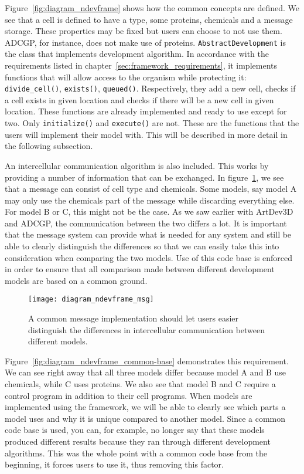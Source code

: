 Figure~\ref{fig:diagram_ndevframe} shows how the common concepts are defined. We see that a cell is defined to have a type, some proteins, chemicals and a message storage. These properties may be fixed but users can choose to not use them. ADCGP, for instance, does not make use of proteins. \texttt{AbstractDevelopment} is the class that implements development algorithm. In accordance with the requirements listed in chapter~\ref{sec:framework_requirements}, it implements functions that will allow access to the organism while protecting it: \texttt{divide\_cell()}, \texttt{exists()}, \texttt{queued()}. Respectively, they add a new cell, checks if a cell exists in given location and checks if there will be a new cell in given location. These functions are already implemented and ready to use except for two. Only \texttt{initialize()} and \texttt{execute()} are not. These are the functions that the users will implement their model with. This will be described in more detail in the following subsection.

An intercellular communication algorithm is also included. This works by providing a number of information that can be exchanged. In figure~\ref{fig:diagram_ndevframe_msg}, we see that a message can consist of cell type and chemicals. Some models, say model A may only use the chemicals part of the message while discarding everything else. For model B or C, this might not be the case. As we saw earlier with ArtDev3D and ADCGP, the communication between the two differs a lot. It is important that the message system can provide what is needed for any system and still be able to clearly distinguish the differences so that we can easily take this into consideration when comparing the two models. Use of this code base is enforced in order to ensure that all comparison made between different development models are based on a common ground.

\begin{figure}[!ht]
	\centering
	\texttt{[image: diagram\_ndevframe\_msg]}
	\caption{A common message implementation should let users easier distinguish the differences in intercellular communication between different models.}
	\label{fig:diagram_ndevframe_msg}
\end{figure}

Figure~\ref{fig:diagram_ndevframe_common-base} demonstrates this requirement. We can see right away that all three models differ because model A and B use chemicals, while C uses proteins. We also see that model B and C require a control program in addition to their cell programs. When models are implemented using the framework, we will be able to clearly see which parts a model uses and why it is unique compared to another model. Since a common code base is used, you can, for example, no longer say that these models produced different results because they ran through different development algorithms. This was the whole point with a common code base from the beginning, it forces users to use it, thus removing this factor.

